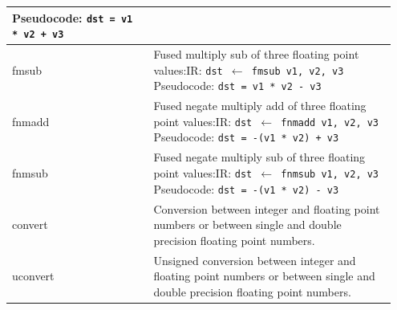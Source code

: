 \documentclass[course=eragp]{aspdoc}
\begin{document}
\begin{center}
\begin{longtable}{p{0.35\linewidth} | p{0.6\linewidth}}
        Pseudocode: \texttt{dst = v1 * v2 + v3}                                                                                                   \\
        \hline
        fmsub        & Fused multiply sub of three floating point values:\newline IR: \texttt{dst $\leftarrow$ fmsub v1, v2, v3} \newline
        Pseudocode: \texttt{dst = v1 * v2 - v3}                                                                                                   \\
        \hline
        fnmadd       & Fused negate multiply add of three floating point values:\newline IR: \texttt{dst $\leftarrow$ fnmadd v1, v2, v3} \newline
        Pseudocode: \texttt{dst = -(v1 * v2) + v3}                                                                                                \\
        \hline
        fnmsub       & Fused negate multiply sub of three floating point values:\newline IR: \texttt{dst $\leftarrow$ fnmsub v1, v2, v3} \newline
        Pseudocode: \texttt{dst = -(v1 * v2) - v3}                                                                                                \\
        \hline
        convert      & Conversion between integer and floating point numbers or between single and double
        precision floating point numbers.
        \\
        \hline
        uconvert     & Unsigned conversion between integer and floating point numbers or between single and double
        precision floating point numbers.                                                                                                         \\
        \hline
    \end{longtable}
    \label{figure:ir_instructions}
\end{center}
\end{document}
